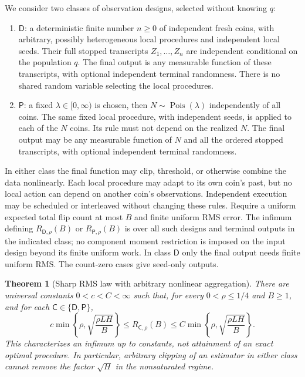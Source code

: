 \documentclass[11pt]{article}
\newtheorem{theorem}{Theorem}
\begin{document}
We consider two classes of observation designs, selected without knowing $q$:
\begin{enumerate}
\item $\mathsf D$: a deterministic finite number $n\ge0$ of independent
fresh coins, with arbitrary, possibly heterogeneous local procedures and
independent local seeds. Their full stopped transcripts $Z_1,\ldots,Z_n$
are independent conditional on the population $q$. The final output is any
measurable function of these transcripts, with optional independent terminal
randomness. There is no shared random variable selecting the local procedures.
\item $\mathsf P$: a fixed $\lambda\in[0,\infty)$ is chosen, then
$N\sim\operatorname{Pois}(\lambda)$ independently of all coins. The same
fixed local procedure, with independent seeds, is applied to each of the
$N$ coins. Its rule must not depend on the realized $N$. The final output
may be any measurable function of $N$ and all the ordered stopped transcripts,
with optional independent terminal randomness.
\end{enumerate}
In either class the final function may clip, threshold, or otherwise combine
the data nonlinearly. Each local procedure may adapt to its own coin's past,
but no local action can depend on another coin's observations. Independent
execution may be scheduled or interleaved without changing these rules.
Require a uniform expected total flip count at most $B$ and finite uniform
RMS error. The infimum defining $R_{\mathsf D,\rho}(B)$ or
$R_{\mathsf P,\rho}(B)$ is over all such designs and terminal outputs in
the indicated class; no component moment restriction is imposed on the input
design beyond its finite uniform work. In class $\mathsf D$ only the final
output needs finite uniform RMS. The count-zero cases give seed-only outputs.

\begin{theorem}[Sharp RMS law with arbitrary nonlinear aggregation]\label{thm:main}
There are universal constants $0<c<C<\infty$ such that, for every
$0<\rho\le1/4$ and $B\ge1$, and for each
$\mathsf C\in\{\mathsf D,\mathsf P\}$,
\[
 c\min\left\{\rho,\sqrt{\frac{\rho LH}{B}}\right\}
 \le R_{\mathsf C,\rho}(B)
 \le C\min\left\{\rho,\sqrt{\frac{\rho LH}{B}}\right\}.       \tag{1}
\]
This characterizes an infimum up to constants, not attainment of an exact
optimal procedure. In particular, arbitrary clipping of an estimator in
either class cannot remove the factor $\sqrt H$ in the nonsaturated regime.
\end{theorem}
\end{document}
